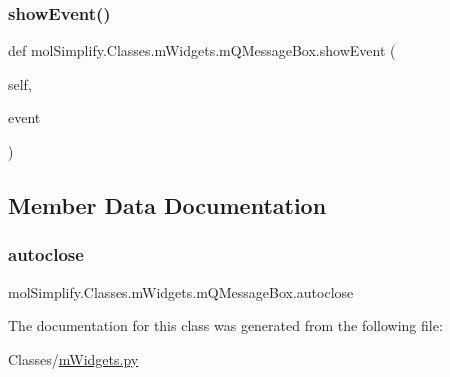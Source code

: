 \subsubsection{\texorpdfstring{show\+Event()}{showEvent()}}
{\footnotesize\ttfamily def mol\+Simplify.\+Classes.\+m\+Widgets.\+m\+Q\+Message\+Box.\+show\+Event (\begin{DoxyParamCaption}\item[{}]{self,  }\item[{}]{event }\end{DoxyParamCaption})}



\subsection{Member Data Documentation}
\mbox{\label{classmolSimplify_1_1Classes_1_1mWidgets_1_1mQMessageBox_a72e0288a3ae9c22560124d97cdaa93e2}} 
\subsubsection{\texorpdfstring{autoclose}{autoclose}}
{\footnotesize\ttfamily mol\+Simplify.\+Classes.\+m\+Widgets.\+m\+Q\+Message\+Box.\+autoclose}



The documentation for this class was generated from the following file\+:\begin{DoxyCompactItemize}
\item 
Classes/\hyperlink{mWidgets_8py}{m\+Widgets.\+py}\end{DoxyCompactItemize}
